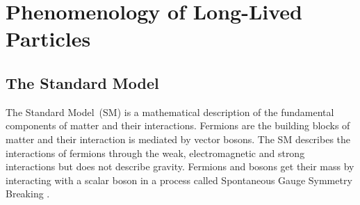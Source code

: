 \chapter{Phenomenology of Long-Lived Particles}
\label{Long_Lived_Particle_physics_chapter}
\section{The Standard Model}
The Standard Model~(SM) is a mathematical description of the fundamental components of matter and their interactions. Fermions are the building blocks of matter and their interaction is mediated by vector bosons. The SM describes the interactions of fermions through the weak, electromagnetic and strong interactions but does not describe gravity. Fermions and bosons get their mass by interacting with a scalar boson in a process called Spontaneous Gauge Symmetry Breaking \cite{SMREV}. 
